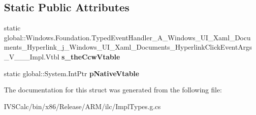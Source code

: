 \subsection*{Static Public Attributes}
\begin{DoxyCompactItemize}
\item 
\mbox{\label{struct_windows_1_1_foundation_1_1_typed_event_handler___a___windows___u_i___xaml___documents___hfd9a29b8a1965140a2921dbd50b4ecfb_a994e7a8cc386a202eab2e3c8a3e4371a}} 
static global\+::\+Windows.\+Foundation.\+Typed\+Event\+Handler\+\_\+\+A\+\_\+\+Windows\+\_\+\+U\+I\+\_\+\+Xaml\+\_\+\+Documents\+\_\+\+Hyperlink\+\_\+j\+\_\+\+Windows\+\_\+\+U\+I\+\_\+\+Xaml\+\_\+\+Documents\+\_\+\+Hyperlink\+Click\+Event\+Args\+\_\+\+V\+\_\+\+\_\+\+\_\+\+Impl.\+Vtbl {\bfseries s\+\_\+the\+Ccw\+Vtable}
\item 
\mbox{\label{struct_windows_1_1_foundation_1_1_typed_event_handler___a___windows___u_i___xaml___documents___hfd9a29b8a1965140a2921dbd50b4ecfb_ac388f73451771769bc3294d8439740ab}} 
static global\+::\+System.\+Int\+Ptr {\bfseries p\+Native\+Vtable}
\end{DoxyCompactItemize}


The documentation for this struct was generated from the following file\+:\begin{DoxyCompactItemize}
\item 
I\+V\+S\+Calc/bin/x86/\+Release/\+A\+R\+M/ilc/Impl\+Types.\+g.\+cs\end{DoxyCompactItemize}
